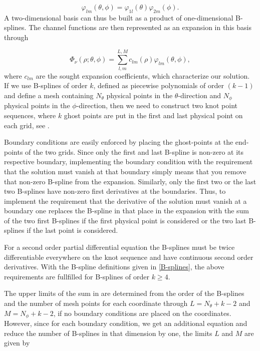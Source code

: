 \begin{equation}
\varphi_{lm} (\theta,\phi) = \varphi_{1l}(\theta)\varphi_{2m}(\phi).
\end{equation}
A two-dimensional basis can thus be built as a product of one-dimensional B-splines. The channel functions are then represented as an expansion in this basis through  

\begin{equation}\label{expansion}
\Phi_{\nu}(\rho;\theta,\phi) = \sum_{l,m}^{L,M} c_{lm}(\rho)\varphi_{lm} (\theta,\phi),
\end{equation}
where $c_{lm}$ are the sought expansion coefficients, which characterize our solution. If we use B-splines of order $k$, defined as piecewise polynomials of order $(k-1)$ and define a mesh containing $N_{\theta}$ physical points in the $\theta$-direction and $N_{\phi}$ physical points in the $\phi$-direction, then we need to construct two knot point sequences, where $k$ ghost points are put in the first and last physical point on each grid, see . 

Boundary conditions are easily enforced by placing the ghost-points at the end-points of the two grids. Since only the first and last B-spline is non-zero at its respective boundary, implementing the boundary condition with the requirement that the solution must vanish at that boundary simply means that you remove that non-zero B-spline from the expansion. Similarly, only the first two or the last two B-splines have non-zero first derivatives at the boundaries. Thus, to implement the requirement that the derivative of the solution must vanish at a boundary one replaces the B-spline in that place in the expansion with the sum of the two first B-splines if the first physical point is considered or the two last B-splines if the last point is considered.

For a second order partial differential equation the B-splines must be twice differentiable everywhere on the knot sequence and have continuous second order derivatives. With the B-spline definitions given in \cref{B-splines}, the above requirements are fullfilled for B-splines of order $k\geq 4$. 

The upper limits of the sum in  are determined from the order of the B-splines and the number of mesh points for each coordinate through $L=N_{\theta}+k-2$ and $M=N_{\phi}+k-2$, if no boundary conditions are placed on the coordinates. However, since for each boundary condition, we get an additional equation and reduce the number of B-splines in that dimension by one, the limits $L$ and $M$ are given by 

